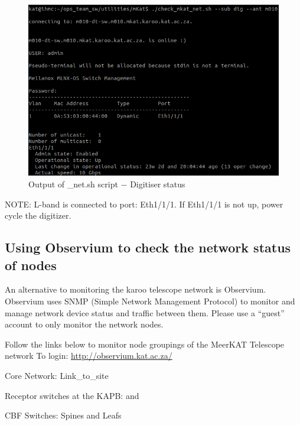 \begin{figure}[!thb]
	\centering
	\includegraphics[scale=0.23]{Chapters/images/image75.png}
	
	\caption{Output of \_net.sh script $-$ Digitiser status}
	\label{fig:image75}
\end{figure}


NOTE: L-band is connected to port: Eth1/1/1. If Eth1/1/1 is not up, power cycle the digitizer.

\subsection{ Using Observium to check the network status of nodes}
An alternative to monitoring the karoo telescope network is Observium. Observium uses SNMP (Simple Network Management Protocol) to monitor and manage network device status and traffic between them. Please use a “guest” account to only monitor the network nodes. 

Follow  the links below to monitor node groupings of the MeerKAT Telescope network
To login: \url{http://observium.kat.ac.za/}


Core Network: Link\_to\_site 

Receptor switches at the KAPB:  and  

CBF Switches: Spines and Leafs

